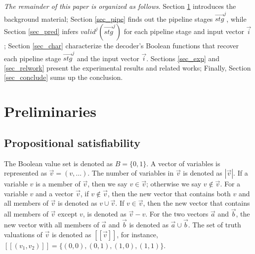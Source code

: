 \documentclass[runningheads,a4paper,orivec]{llncs}
\begin{document}
\emph{The remainder of this paper is organized as follows}.
Section \ref{sec_prem} introduces the background material;
Section \ref{sec_pipe} finds out the pipeline stages $\vec{stg}^j$,
while Section \ref{sec_pred} infers  $valid^j(\vec{stg}^j)$ for each pipeline stage and input vector $\vec{i}$;
Section \ref{sec_char} characterize the decoder's Boolean functions that recover each pipeline stage $\vec{stg}^j$ and the input vector $\vec{i}$.
Sections \ref{sec_exp} and \ref{sec_relwork} present the experimental results and related works;
Finally,
Section \ref{sec_conclude} sums up the conclusion.

\section{Preliminaries}\label{sec_prem}




\subsection{Propositional satisfiability}\label{subsec_SAT}
The Boolean value set is denoted as $B=\{0,1\}$.
A vector of variables is represented as $\vec{v}=(v,\dots)$.
The number of variables in $\vec{v}$ is denoted as $|\vec{v}|$.
If a variable $v$ is a member of $\vec{v}$,
then we say $v\in\vec{v}$;
otherwise we say $v\notin\vec{v}$.
For a variable $v$ and a vector $\vec{v}$,
if $v\notin\vec{v}$,
then the new vector that contains both $v$ and all members of $\vec{v}$ is denoted as $v\cup\vec{v}$.
If $v\in \vec{v}$,
then the new vector that contains all members of $\vec{v}$ except $v$,
is denoted as $\vec{v}-v$.
For the two vectors $\vec{a}$ and $\vec{b}$,
the new vector with all members of $\vec{a}$ and $\vec{b}$ is denoted as $\vec{a}\cup\vec{b}$.
The set of truth valuations of $\vec{v}$ is denoted as $[\![\vec{v}]\!]$,
for instance,
$[\![(v_1,v_2)]\!]=\{(0,0),(0,1),(1,0),(1,1)\}$.
\end{document}
